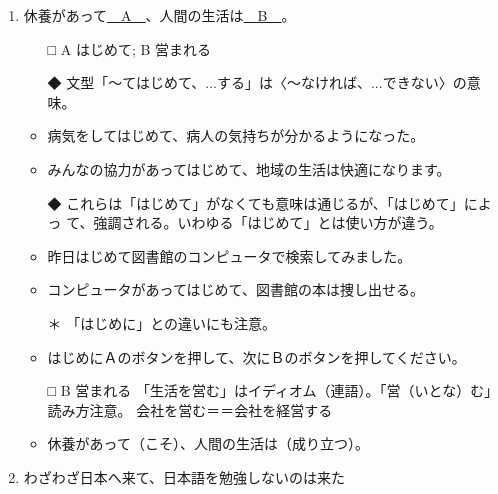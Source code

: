 \documentclass[
uplatex,
b5paper,
10pt,
dvipdfmx
]{jsbook}
\begin{document}
\begin{enumerate}
\item 休養があって\underline{　A　}、人間の生活は\underline{　B　}。
\begin{itemize}
\item[□] A はじめて; B 営まれる
\item[◆] 文型「〜てはじめて、...する」は〈〜なければ、...できない〉の意味。
\end{itemize}
\begin{itemize}
 \item 病気をしてはじめて、病人の気持ちが分かるようになった。
 \item みんなの協力があってはじめて、地域の生活は快適になります。
\end{itemize}
\begin{itemize}
 \item[◆] これらは「はじめて」がなくても意味は通じるが、「はじめて」によっ
       て、強調される。いわゆる「はじめて」とは使い方が違う。
\end{itemize}
\begin{itemize}
 \item 昨日はじめて図書館のコンピュータで検索してみました。
 \item コンピュータがあってはじめて、図書館の本は捜し出せる。      
\end{itemize}
\begin{itemize}
 \item[＊] 「はじめに」との違いにも注意。
\end{itemize}
\begin{itemize}
 \item はじめにＡのボタンを押して、次にＢのボタンを押してください。 
\end{itemize}
\begin{itemize}
\item[□] B 営まれる
  「生活を営む」はイディオム（連語）。「営（いとな）む」読み方注意。
  会社を営む＝＝会社を経営する
\end{itemize}
\begin{itemize}
 \item 休養があって（こそ）、人間の生活は（成り立つ）。
\end{itemize}

\item わざわざ日本へ来て、日本語を勉強しないのは来た\underline{\hspace{3zw}}


\end{enumerate}
\end{document}
